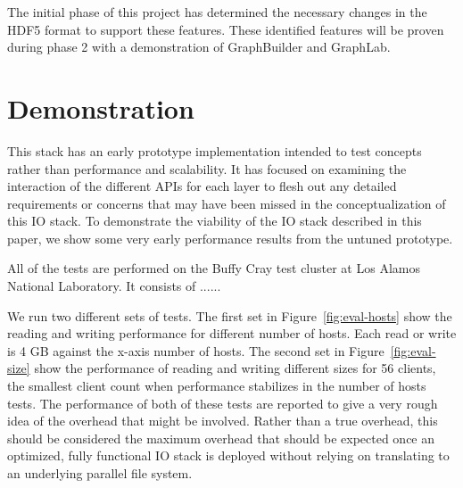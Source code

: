 \documentclass[conference]{IEEEtran}
\begin{document}
The initial phase of this project has determined the necessary changes in the
HDF5 format to support these features. These identified features will be
proven during phase 2 with a demonstration of GraphBuilder and GraphLab.

\section{Demonstration}
\label{sec:evaluation}

This stack has an early prototype implementation intended to test concepts
rather than performance and scalability. It has focused on examining the
interaction of the different APIs for each layer to flesh out any detailed
requirements or concerns that may have been missed in the conceptualization of
this IO stack. To demonstrate the viability of the IO stack described in this
paper, we show some very early performance results from the untuned prototype.

All of the tests are performed on the Buffy Cray test cluster at Los Alamos
National Laboratory. It consists of ......

We run two different sets of tests. The first set in
Figure~\ref{fig:eval-hosts} show the reading and writing performance for
different number of hosts. Each read or write is 4 GB against the x-axis number
of hosts. The second set in Figure~\ref{fig:eval-size} show the performance of
reading and writing different sizes for 56 clients, the smallest client count
when performance stabilizes in the number of hosts tests.  The performance of
both of these tests are reported to give a very rough idea of the overhead that
might be involved. Rather than a true overhead, this should be considered the
maximum overhead that should be expected once an optimized, fully functional IO
stack is deployed without relying on translating to an underlying parallel file
system. 
\end{document}
